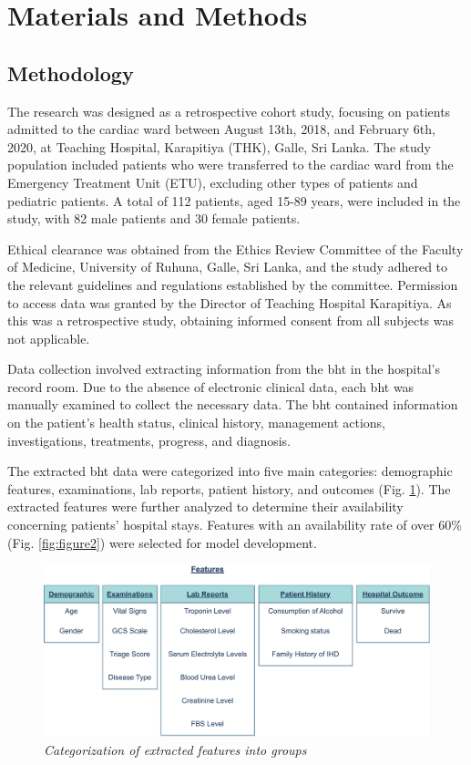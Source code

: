 \documentclass[journal,article,submit,pdftex,moreauthors]{Definitions/mdpi}
\begin{document}
\section{Materials and Methods}
\subsection{Methodology}
The research was designed as a retrospective cohort study, focusing on patients admitted to the cardiac ward between August 13th, 2018, and February 6th, 2020, at Teaching Hospital, Karapitiya (THK), Galle, Sri Lanka. The study population included patients who were transferred to the cardiac ward from the Emergency Treatment Unit (ETU), excluding other types of patients and pediatric patients. A total of 112 patients, aged 15-89 years, were included in the study, with 82 male patients and 30 female patients.

Ethical clearance was obtained from the Ethics Review Committee of the Faculty of Medicine, University of Ruhuna, Galle, Sri Lanka, and the study adhered to the relevant guidelines and regulations established by the committee. Permission to access data was granted by the Director of Teaching Hospital Karapitiya. As this was a retrospective study, obtaining informed consent from all subjects was not applicable.

Data collection involved extracting information from the \gls{bht} in the hospital's record room. Due to the absence of electronic clinical data, each \gls{bht} was manually examined to collect the necessary data. The \gls{bht} contained information on the patient's health status, clinical history, management actions, investigations, treatments, progress, and diagnosis.

The extracted \gls{bht} data were categorized into five main categories: demographic features, examinations, lab reports, patient history, and outcomes (Fig. \ref{fig:figure1}). The extracted features were further analyzed to determine their availability concerning patients' hospital stays. Features with an availability rate of over 60\% (Fig. \ref{fig:figure2}) were selected for model development.

\begin{figure}[hbt!]
    \centering
    \includegraphics[width=1\linewidth]{images/featureCategorization.pdf}
    \caption{\textit{Categorization of extracted features into groups}}
    \label{fig:figure1}
    \vspace{-10pt}
\end{figure}
\end{document}
